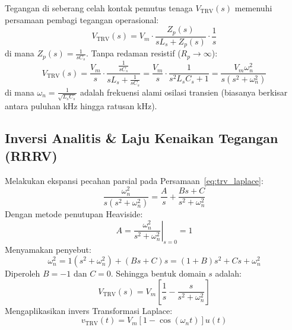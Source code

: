 \documentclass[11pt,a4paper]{article}
\theoremstyle{definition}
\begin{document}
Tegangan di seberang celah kontak pemutus tenaga $V_{\text{TRV}}(s)$ memenuhi persamaan pembagi tegangan operasional:
\begin{equation}
    V_{\text{TRV}}(s) = V_m \cdot \frac{Z_p(s)}{s L_s + Z_p(s)} \cdot \frac{1}{s}
\end{equation}
di mana $Z_p(s) = \frac{1}{s C_s}$. Tanpa redaman resistif ($R_p \to \infty$):
\begin{equation}
    V_{\text{TRV}}(s) = \frac{V_m}{s} \cdot \frac{\frac{1}{s C_s}}{s L_s + \frac{1}{s C_s}} = \frac{V_m}{s} \cdot \frac{1}{s^2 L_s C_s + 1} = \frac{V_m \omega_n^2}{s (s^2 + \omega_n^2)}
    \label{eq:trv_laplace}
\end{equation}
di mana $\omega_n = \frac{1}{\sqrt{L_s C_s}}$ adalah frekuensi alami osilasi transien (biasanya berkisar antara puluhan kHz hingga ratusan kHz).

\subsection{Inversi Analitis \& Laju Kenaikan Tegangan (RRRV)}
Melakukan ekspansi pecahan parsial pada Persamaan~\eqref{eq:trv_laplace}:
\begin{equation}
    \frac{\omega_n^2}{s (s^2 + \omega_n^2)} = \frac{A}{s} + \frac{B s + C}{s^2 + \omega_n^2}
\end{equation}
Dengan metode penutupan Heaviside:
\begin{equation*}
    A = \left. \frac{\omega_n^2}{s^2 + \omega_n^2} \right|_{s = 0} = 1
\end{equation*}
Menyamakan penyebut:
\begin{equation*}
    \omega_n^2 = 1(s^2 + \omega_n^2) + (Bs + C)s = (1 + B)s^2 + Cs + \omega_n^2
\end{equation*}
Diperoleh $B = -1$ dan $C = 0$. Sehingga bentuk domain $s$ adalah:
\begin{equation}
    V_{\text{TRV}}(s) = V_m \left[ \frac{1}{s} - \frac{s}{s^2 + \omega_n^2} \right]
\end{equation}
Mengaplikasikan invers Transformasi Laplace:
\begin{equation}
    v_{\text{TRV}}(t) = V_m \left[ 1 - \cos(\omega_n t) \right] u(t)
    \label{eq:trv_solution_time}
\end{equation}
\end{document}

